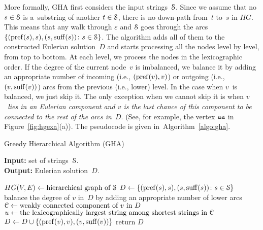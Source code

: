More formally, GHA first considers the input
strings~${\cal S}$. Since we assume that 
no $s \in {\cal S}$ is a~substring of another 
$t \in {\cal S}$, there is no down-path from~$t$ to~$s$ in $HG$. 
This means that any walk through $\varepsilon$ and ${\cal S}$ goes through the arcs $\{(\operatorname{pref}(s), s), (s, \operatorname{suff}(s)) \colon s \in {\cal S}\}$. The algorithm adds all of them to the constructed Eulerian solution~$D$ and starts processing all the nodes level by level, from top to bottom. At each level, we process the nodes in the lexicographic order. If the degree of the current node~$v$ is imbalanced, we balance it by adding an appropriate number of incoming (i.e., $(\operatorname{pref}(v),v)$) or outgoing (i.e., $(v, \operatorname{suff}(v))$) arcs from the previous (i.e., lower) level. In the case when $v$~is balanced, we just skip it. The only exception when we cannot skip it is when {\em $v$~lies in an Eulerian component and $v$ is the last chance of this component to be connected to the rest of the arcs in~$D$}. (See, for example, the vertex $ {\tt aa}$ in Figure~\ref{fig:hgexa}(a)). The pseudocode is given in~Algorithm~\ref{algo:gha}. 


\begin{algorithm}[!ht]
\caption{Greedy Hierarchical Algorithm (GHA)}\label{algo:gha}
\hspace*{\algorithmicindent} \textbf{Input:} set of strings~${\cal S}$.\\
\hspace*{\algorithmicindent} \textbf{Output:} Eulerian solution~$D$.
\begin{algorithmic}[1]
\State $HG(V,E) \gets \text{hierarchical graph of ${\cal S}$}$ 
\State\label{alg:gha_init}$D \gets \{(\operatorname{pref}(s), s), (s, \operatorname{suff}(s)) \colon s \in {\cal S}\}$
\label{alg:for}
\State\label{alg:step6} balance the degree of $v$ in~$D$ by adding an appropriate number of lower arcs
\Else
\State\label{alg:else} ${\cal C} \gets \text{weakly connected component of $v$ in $D$}$
\State $u \gets \text{the lexicographically largest string among shortest strings in ${\cal C}$}$
\State\label{alg:last} $D \gets D \cup \{(\operatorname{pref}(v), v), (v, \operatorname{suff}(v))\}$
\EndIf
\EndIf
\EndFor
\EndFor
\State return $D$
\end{algorithmic}
\end{algorithm}



